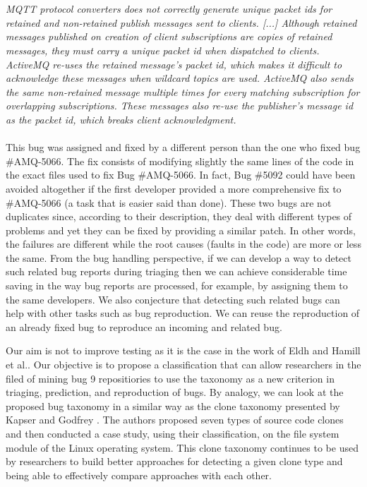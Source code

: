 \\ \\
{\it MQTT protocol converters does not correctly generate unique packet ids for retained and non-retained publish messages sent to clients.
[...] Although retained messages published on creation of client subscriptions are copies of retained messages, they must carry a unique packet id when dispatched to clients.
ActiveMQ re-uses the retained message's packet id, which makes it difficult to  acknowledge these messages when wildcard topics are used.
ActiveMQ also sends the same non-retained message multiple times for every matching subscription for overlapping subscriptions.
These messages also re-use the publisher's message id as the packet id, which breaks client acknowledgment.}
\\ \\
This bug was assigned and fixed by a different person than the one who fixed bug \#AMQ-5066.
The fix consists of modifying slightly the same lines of the code in the exact files used to fix Bug \#AMQ-5066.
In fact, Bug \#5092 could have been avoided altogether if the first developer provided a more comprehensive fix to \#AMQ-5066 (a task that is easier said than done).
These two bugs are not duplicates since, according to their description, they deal with different types of problems and yet they can be fixed by providing a similar patch.
In other words, the failures are different while the root causes (faults in the code) are more or less the same.
From the bug handling perspective, if we can develop a way to detect such related bug reports during triaging then we can achieve considerable time saving in the way bug reports are processed, for example, by assigning them to the same developers.
We also conjecture that detecting such related bugs can help with other tasks such as bug reproduction.
We can  reuse the reproduction of an already fixed bug to reproduce an incoming and related bug.

Our aim is not to improve testing as it is the case in the work of Eldh \cite{Eldh2001} and Hamill et al.\cite{Hamill2014}.
Our objective is to propose a classification that can allow researchers in the filed of mining bug 9 repositiories to use the taxonomy as a new criterion in triaging, prediction, and reproduction of bugs.
By analogy, we can look at the proposed bug taxonomy in a similar way as the clone taxonomy presented by Kapser and Godfrey \cite{CoryKapser}.
The authors proposed seven types of source code clones and then conducted a case study, using their classification, on the file system module of the Linux operating system.
This clone taxonomy continues to be used by researchers to build better approaches for detecting a given clone type and being able to effectively compare approaches with each other.

